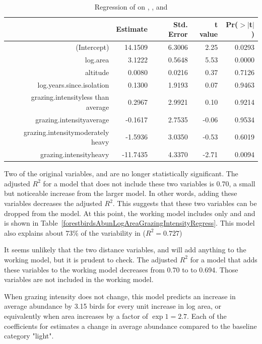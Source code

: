 \begin{table}[ht]
\centering
\begin{tabular}{rrrrr}
  \hline
 & Estimate & Std. Error & t value & Pr($>$$|$t$|$) \\ 
  \hline
(Intercept) & 14.1509 & 6.3006 & 2.25 & 0.0293 \\ 
  log.area & 3.1222 & 0.5648 & 5.53 & 0.0000 \\ 
  altitude & 0.0080 & 0.0216 & 0.37 & 0.7126 \\ 
  log.years.since.isolation & 0.1300 & 1.9193 & 0.07 & 0.9463 \\ 
  grazing.intensityless than average & 0.2967 & 2.9921 & 0.10 & 0.9214 \\ 
  grazing.intensityaverage & -0.1617 & 2.7535 & -0.06 & 0.9534 \\ 
  grazing.intensitymoderately heavy & -1.5936 & 3.0350 & -0.53 & 0.6019 \\ 
  grazing.intensityheavy & -11.7435 & 4.3370 & -2.71 & 0.0094 \\ 
   \hline
\end{tabular}
\caption{Regression of  on , ,  and }
\label{forestbirdsAbunLogAreaAltLogIsolGrazingIntensityRegress}
\end{table}

Two of the original variables,  and  are no longer statistically significant.  The adjusted $R^2$ for a model that does not include these two variables is 0.70, a small but noticeable increase from the larger model. In other words, adding these variables decreases the adjusted $R^2$. This suggests that these two variables can be dropped from the model.  At this point, the working model includes only  and  and is shown in Table~\ref{forestbirdsAbunLogAreaGrazingIntensityRegress}.  This model also explains about 73\% of the variability in  ($R^2 = 0.727$)

It seems unlikely that the two distance variables,  and  will add anything to the working model, but it is prudent to check.  The adjusted $R^2$ for a model that adds these variables to the working model decreases from 0.70 to to 0.694.  Those variables are not included in the working model.

When grazing intensity does not change, this model predicts an increase in average abundance by 3.15 birds for every unit increase in log area, or equivalently when area increases by a factor of $\exp{1} = 2.7$.  Each of the coefficients for  estimates a change in average abundance compared to the baseline category "light".  

